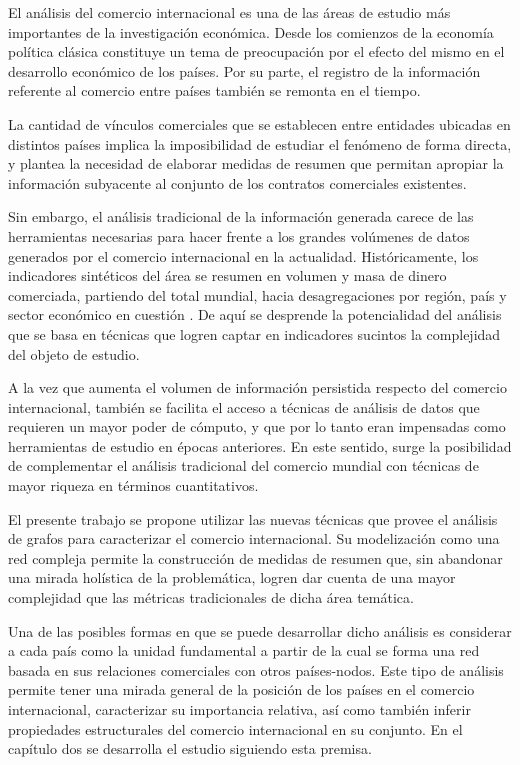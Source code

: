 \documentclass[class=article, crop=false]{standalone}
\begin{document}
El análisis del comercio internacional es una de las áreas de estudio más importantes de la investigación económica. Desde los comienzos de la economía política clásica constituye un tema de preocupación por el efecto del mismo en el desarrollo económico de los países\cite{ricardo1987principios}. Por su parte, el registro de la información referente al comercio entre países también se remonta en el tiempo.          

La cantidad de vínculos comerciales que se establecen entre entidades ubicadas en distintos países implica la imposibilidad de estudiar el fenómeno de forma directa, y plantea la necesidad de elaborar medidas de resumen que permitan apropiar la información subyacente al conjunto de los contratos comerciales existentes. 

Sin embargo, el análisis tradicional de la información generada carece de las herramientas necesarias para hacer frente a los grandes volúmenes de datos generados por el comercio internacional en la actualidad. Históricamente, los indicadores sintéticos del área se resumen en volumen y masa de dinero comerciada, partiendo del total mundial, hacia desagregaciones por región, país y sector económico en cuestión \cite{WTO2017}. De aquí se desprende la potencialidad del análisis que se basa en técnicas que logren captar en indicadores sucintos la complejidad del objeto de estudio.

A la vez que aumenta el volumen de información persistida respecto del comercio internacional, también se facilita el acceso a técnicas de análisis de datos que requieren un mayor poder de cómputo, y que por lo tanto eran impensadas como herramientas de estudio en épocas anteriores. En este sentido, surge la posibilidad de complementar el análisis tradicional del comercio mundial con técnicas de mayor riqueza en términos cuantitativos. 

El presente trabajo se propone utilizar las nuevas técnicas que provee el análisis de grafos para caracterizar el comercio internacional. Su modelización como una red compleja permite la construcción de medidas de resumen que, sin abandonar una mirada holística de la problemática, logren dar cuenta de una mayor complejidad que las métricas tradicionales de dicha área temática. 

Una de las posibles formas en que se puede desarrollar dicho análisis es considerar a cada país como la unidad fundamental a partir de la cual se forma una red basada en sus relaciones comerciales con otros países-nodos. Este tipo de análisis permite tener una mirada general de la posición de los países en el comercio internacional, caracterizar su importancia relativa, así como también inferir propiedades estructurales del comercio internacional en su conjunto. En el capítulo dos se desarrolla el estudio siguiendo esta premisa. 
\end{document}
